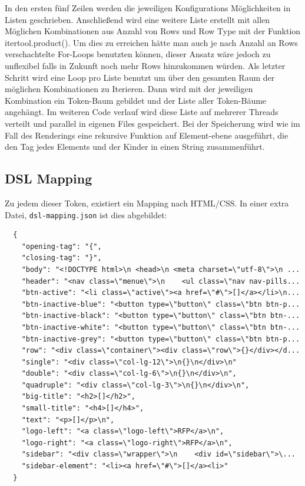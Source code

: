\documentclass[pdftex,a4paper,halfparskip, article]{scrartcl}
\begin{document}
In den ersten fünf Zeilen werden die jeweiligen Konfigurations Möglichkeiten in Listen geschrieben. Anschließend wird eine weitere Liste erstellt mit allen Möglichen Kombinationen aus Anzahl von Rows und Row Type mit der Funktion itertool.product(). Um dies zu erreichen hätte man auch je nach Anzahl an Rows verschachtelte For-Loops benutzten können, dieser Ansatz wäre jedoch zu unflexibel falls in Zukunft noch mehr Rows hinzukommen würden.
Als letzter Schritt wird eine Loop pro Liste benutzt um über den gesamten Raum der möglichen Kombinationen zu Iterieren. Dann wird mit der jeweiligen Kombination ein Token-Baum gebildet und der Liste aller Token-Bäume angehängt. Im weiteren Code verlauf wird diese Liste auf mehrerer Threads verteilt und parallel in eigenen Files gespeichert.
Bei der Speicherung wird wie im Fall des Renderings eine rekursive Funktion auf Element-ebene ausgeführt, die den Tag jedes Elements und der Kinder in einen String zusammenführt.

\subsection{DSL Mapping}

Zu jedem dieser Token, existiert ein Mapping nach HTML/CSS. In einer extra Datei, \texttt{dsl-mapping.json} ist dies abgebildet:

\begin{verbatim}
  {
    "opening-tag": "{",
    "closing-tag": "}",
    "body": "<!DOCTYPE html>\n <head>\n <meta charset=\"utf-8\">\n ...
    "header": "<nav class=\"menue\">\n    <ul class=\"nav nav-pills...
    "btn-active": "<li class=\"active\"><a href=\"#\">[]</a></li>\n...
    "btn-inactive-blue": "<button type=\"button\" class=\"btn btn-p...
    "btn-inactive-black": "<button type=\"button\" class=\"btn btn-...
    "btn-inactive-white": "<button type=\"button\" class=\"btn btn-...
    "btn-inactive-grey": "<button type=\"button\" class=\"btn btn-p...
    "row": "<div class=\"container\"><div class=\"row\">{}</div></d...
    "single": "<div class=\"col-lg-12\">\n{}\n</div>\n"
    "double": "<div class=\"col-lg-6\">\n{}\n</div>\n",
    "quadruple": "<div class=\"col-lg-3\">\n{}\n</div>\n",
    "big-title": "<h2>[]</h2>",
    "small-title": "<h4>[]</h4>",
    "text": "<p>[]</p>\n",
    "logo-left": "<a class=\"logo-left\">RFP</a>\n",
    "logo-right": "<a class=\"logo-right\">RFP</a>\n",
    "sidebar": "<div class=\"wrapper\">\n    <div id=\"sidebar\">\...
    "sidebar-element": "<li><a href=\"#\">[]</a><li>"  
  }
  
\end{verbatim}
\end{document}
